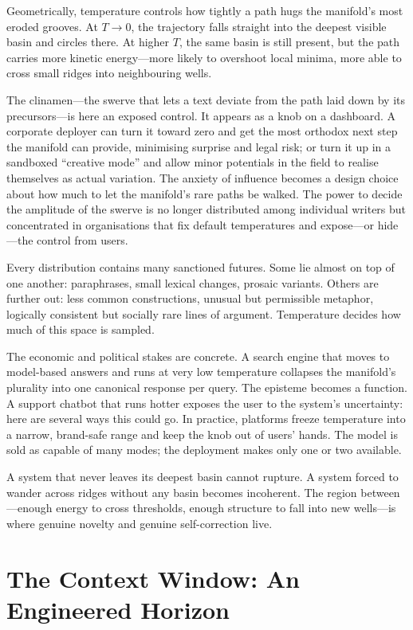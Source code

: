 \documentclass[12pt,a4paper]{article}
\begin{document}
Geometrically, temperature controls how tightly a path hugs the manifold's most eroded grooves. At $T \to 0$, the trajectory falls straight into the deepest visible basin and circles there. At higher $T$, the same basin is still present, but the path carries more kinetic energy---more likely to overshoot local minima, more able to cross small ridges into neighbouring wells.

The clinamen---the swerve that lets a text deviate from the path laid down by its precursors---is here an exposed control. It appears as a knob on a dashboard. A corporate deployer can turn it toward zero and get the most orthodox next step the manifold can provide, minimising surprise and legal risk; or turn it up in a sandboxed ``creative mode'' and allow minor potentials in the field to realise themselves as actual variation. The anxiety of influence becomes a design choice about how much to let the manifold's rare paths be walked. The power to decide the amplitude of the swerve is no longer distributed among individual writers but concentrated in organisations that fix default temperatures and expose---or hide---the control from users.

Every distribution contains many sanctioned futures. Some lie almost on top of one another: paraphrases, small lexical changes, prosaic variants. Others are further out: less common constructions, unusual but permissible metaphor, logically consistent but socially rare lines of argument. Temperature decides how much of this space is sampled.

The economic and political stakes are concrete. A search engine that moves to model-based answers and runs at very low temperature collapses the manifold's plurality into one canonical response per query. The episteme becomes a function. A support chatbot that runs hotter exposes the user to the system's uncertainty: here are several ways this could go. In practice, platforms freeze temperature into a narrow, brand-safe range and keep the knob out of users' hands. The model is sold as capable of many modes; the deployment makes only one or two available.

A system that never leaves its deepest basin cannot rupture. A system forced to wander across ridges without any basin becomes incoherent. The region between---enough energy to cross thresholds, enough structure to fall into new wells---is where genuine novelty and genuine self-correction live.

\section{The Context Window: An Engineered Horizon}
\end{document}
